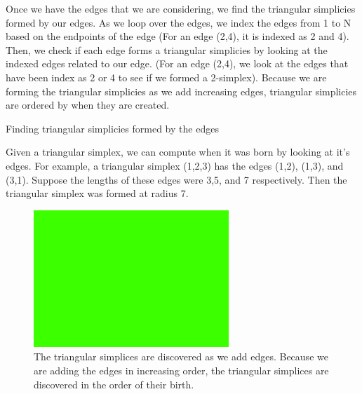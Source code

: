 \documentclass[12pt, a4paper, twocolumn, fullpage]{article}
\theoremstyle{plain}
\theoremstyle{definition}
\theoremstyle{remark}
\begin{document}
Once we have the edges that we are considering, we find the triangular simplicies formed by our edges. As we loop over the edges, we index the edges from 1 to N based on the endpoints of the edge (For an edge (2,4),   it is indexed as 2 and 4). Then, we check if each edge forms a triangular simplicies by looking at the indexed edges related to our edge. (For an edge (2,4), we look at the edges that have been index as 2 or 4 to see if we formed a 2-simplex). Because we are forming the triangular simplicies as we add increasing edges, triangular simplicies are ordered by when they are created. 

\begin{algorithm}
\caption{Finding triangular simplicies formed by the edges}
\begin{algorithmic}
    \ENDFOR
\ENDFOR
\end{algorithmic}
\end{algorithm}

Given a triangular simplex, we can compute when it was born by looking at it's edges. For example, a triangular simplex (1,2,3) has the edges (1,2), (1,3), and (3,1). Suppose the lengths of these edges were 3,5, and 7 respectively. Then the triangular simplex was formed at radius 7. 

\begin{figure}[t]
    \includegraphics[width=\linewidth]{img/blank.png}
    \caption{The triangular simplices are discovered as we add edges. Because we are adding the edges in increasing order, the triangular simplices are discovered in the order of their birth.}
    \label{Simplex formation algorithm}
\end{figure}
\end{document}
